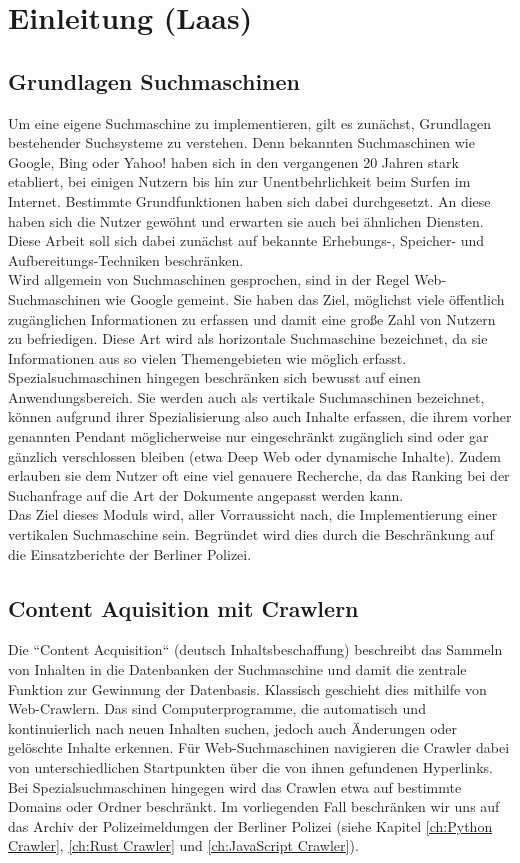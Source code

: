 \chapter{Einleitung \small(Laas)}

\section{Grundlagen Suchmaschinen}
Um eine eigene Suchmaschine zu implementieren, gilt es zunächst, Grundlagen bestehender Suchsysteme zu verstehen. Denn bekannten Suchmaschinen wie Google, Bing oder Yahoo! haben sich in den vergangenen 20 Jahren stark etabliert, bei einigen Nutzern bis hin zur Unentbehrlichkeit beim Surfen im Internet. Bestimmte Grundfunktionen haben sich dabei durchgesetzt. An diese haben sich die Nutzer gewöhnt und erwarten sie auch bei ähnlichen Diensten. Diese Arbeit soll sich dabei zunächst auf bekannte Erhebungs-, Speicher- und Aufbereitungs-Techniken beschränken.\\
Wird allgemein von Suchmaschinen gesprochen, sind in der Regel Web-Suchmaschinen wie Google gemeint. Sie haben das Ziel, möglichst viele öffentlich zugänglichen Informationen zu erfassen und damit eine große Zahl von Nutzern zu befriedigen. Diese Art wird als horizontale Suchmaschine bezeichnet, da sie Informationen aus so vielen Themengebieten wie möglich erfasst.\\
Spezialsuchmaschinen hingegen beschränken sich bewusst auf einen Anwendungsbereich. Sie werden auch als vertikale Suchmaschinen bezeichnet, können aufgrund ihrer Spezialisierung also auch Inhalte erfassen, die ihrem vorher genannten Pendant möglicherweise nur eingeschränkt zugänglich sind oder gar gänzlich verschlossen bleiben (etwa Deep Web oder dynamische Inhalte). Zudem erlauben sie dem Nutzer oft eine viel genauere Recherche, da das Ranking bei der Suchanfrage auf die Art der Dokumente angepasst werden kann.\\
Das Ziel dieses Moduls wird, aller Vorraussicht nach, die Implementierung einer vertikalen Suchmaschine sein. Begründet wird dies durch die Beschränkung auf die Einsatzberichte der Berliner Polizei.

\section{Content Aquisition mit Crawlern}
Die ``Content Acquisition`` (deutsch Inhaltsbeschaffung) beschreibt das Sammeln von Inhalten in die Datenbanken der Suchmaschine und damit die zentrale Funktion zur Gewinnung der Datenbasis. Klassisch geschieht dies mithilfe von Web-Crawlern. Das sind Computerprogramme, die automatisch und kontinuierlich nach neuen Inhalten suchen, jedoch auch Änderungen oder gelöschte Inhalte erkennen. Für Web-Suchmaschinen navigieren die Crawler dabei von unterschiedlichen Startpunkten über die von ihnen gefundenen Hyperlinks. Bei Spezialsuchmaschinen hingegen wird das Crawlen etwa auf bestimmte Domains oder Ordner beschränkt. Im vorliegenden Fall beschränken wir uns auf das Archiv der Polizeimeldungen der Berliner Polizei (siehe Kapitel \ref{ch:Python Crawler}, \ref{ch:Rust Crawler} und \ref{ch:JavaScript Crawler}).

